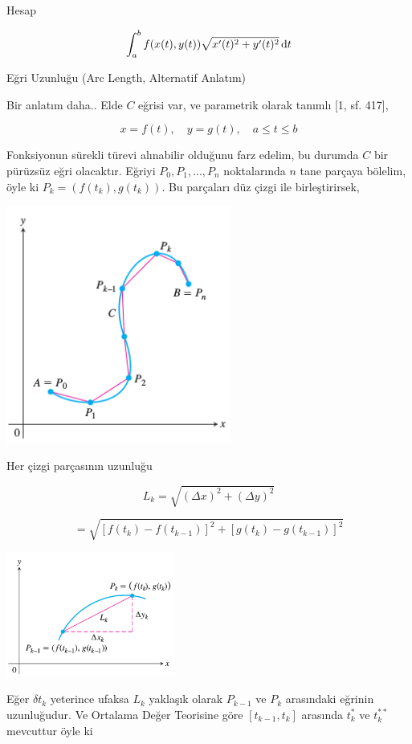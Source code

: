 \documentclass[12pt,fleqn]{article}\usepackage{../../common}
\begin{document}
Hesap

$$
\int_{a}^{b} f(x(t),y(t)) \sqrt {x'(t)^2 + y'(t)^2} \,\mathrm{d} t
$$


Eğri Uzunluğu (Arc Length, Alternatif Anlatım)

Bir anlatım daha.. Elde $C$ eğrisi var, ve parametrik olarak tanımlı [1, sf. 417],

$$
x = f(t), \quad y = g(t), \quad a \le t \le b
$$

Fonksiyonun sürekli türevi alınabilir olduğunu farz edelim, bu durumda $C$ bir
pürüzsüz eğri olacaktır.  Eğriyi $P_0,P_1,...,P_n$ noktalarında $n$ tane parçaya
bölelim, öyle ki $P_k = (f(t_k),g(t_k))$. Bu parçaları düz çizgi ile
birleştirirsek,

\includegraphics[width=20em]{calc_multi_06_01.png}

Her çizgi parçasının uzunluğu 

$$
L_k = \sqrt{(\Delta x)^2 + (\Delta y)^2}
$$

$$
= \sqrt{[f(t_k) - f(t_{k-1})]^2 + [g(t_k) - g(t_{k-1})]^2 }
$$

\includegraphics[width=15em]{calc_multi_06_03.png}

Eğer $\delta t_k$ yeterince ufaksa $L_k$ yaklaşık olarak $P_{k-1}$ ve $P_k$
arasındaki eğrinin uzunluğudur. Ve Ortalama Değer Teorisine göre $[t_{k-1},t_k]$
arasında $t_k^\ast$ ve $t_k^{**}$ mevcuttur öyle ki
\end{document}
